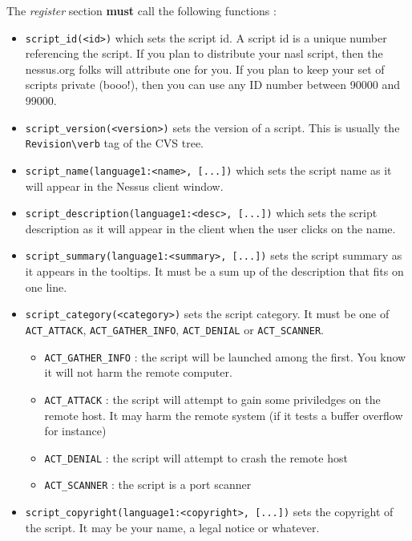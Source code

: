 \documentclass{article}
\begin{document}
The \textit{register} section \textbf{must} call the following functions :
\begin{itemize}
 \item \verb+script_id(<id>)+ which sets the script id. A script id is a unique number referencing the script. If you plan to distribute your nasl script, then the nessus.org folks will attribute one for you. If you plan to keep your set of scripts private (booo!), then you can use any ID number between 90000 and 99000.

\item \verb+script_version(<version>)+ sets the version of a script. This is usually the \verb+Revision\verb+ tag of the CVS tree.


 \item \verb+script_name(language1:<name>, [...])+ which sets the script name as
it will appear in the Nessus client window.
 
 \item \verb+script_description(language1:<desc>, [...])+ which sets the script
description as it will appear in the client when the user clicks on the name.

\item \verb+script_summary(language1:<summary>, [...])+ sets the script summary
as it appears in the tooltips. It must be a sum up of the description that fits
on one line.

\item \verb+script_category(<category>)+ sets the script category. It must be
one of \verb+ACT_ATTACK+, \verb+ACT_GATHER_INFO+, \verb+ACT_DENIAL+ or
\verb+ACT_SCANNER+. 
	\begin{itemize}
	\item \verb+ACT_GATHER_INFO+ : the script will be launched among the
	first. You know it will not harm the remote computer.
	
	\item \verb+ACT_ATTACK+ : the script will attempt to gain some
	priviledges on the remote host. It may harm the remote system
	(if it tests a buffer overflow for instance)
	
	\item \verb+ACT_DENIAL+ : the script will attempt to crash the remote
	host
	
	\item \verb+ACT_SCANNER+ : the script is a port scanner
	\end{itemize}
\item \verb+script_copyright(language1:<copyright>, [...])+ sets the copyright
of the script. It may be your name, a legal notice or whatever.


\end{itemize}
\end{document}
